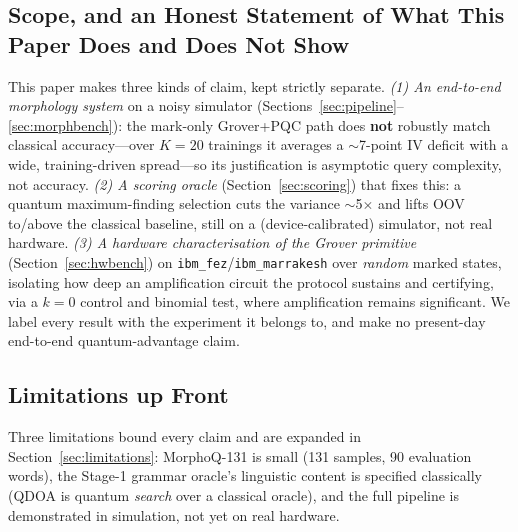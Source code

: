 \documentclass[journal]{IEEEtran}
\begin{document}
\subsection{Scope, and an Honest Statement of What This Paper Does and Does Not
Show}
This paper makes three kinds of claim, kept strictly separate.
\emph{(1) An end-to-end morphology system} on a noisy simulator
(Sections~\ref{sec:pipeline}--\ref{sec:morphbench}): the mark-only Grover+PQC path
does \textbf{not} robustly match classical accuracy---over $K{=}20$ trainings it
averages a $\sim$7-point IV deficit with a wide, training-driven spread---so its
justification is asymptotic query complexity, not accuracy. \emph{(2) A scoring
oracle} (Section~\ref{sec:scoring}) that fixes this: a quantum maximum-finding
selection cuts the variance $\sim$5$\times$ and lifts OOV to/above the classical
baseline, still on a (device-calibrated) simulator, not real hardware.
\emph{(3) A hardware characterisation of the Grover primitive}
(Section~\ref{sec:hwbench}) on \texttt{ibm\_fez}/\texttt{ibm\_marrakesh} over
\emph{random} marked states, isolating how deep an amplification circuit the
protocol sustains and certifying, via a $k{=}0$ control and binomial test, where
amplification remains significant. We label every result with the experiment it
belongs to, and make no present-day end-to-end quantum-advantage claim.

\subsection{Limitations up Front}
Three limitations bound every claim and are expanded in
Section~\ref{sec:limitations}: MorphoQ-131 is small (131 samples, 90 evaluation
words), the Stage-1 grammar oracle's linguistic content is specified classically
(QDOA is quantum \emph{search} over a classical oracle), and the full pipeline is
demonstrated in simulation, not yet on real hardware.
\end{document}
